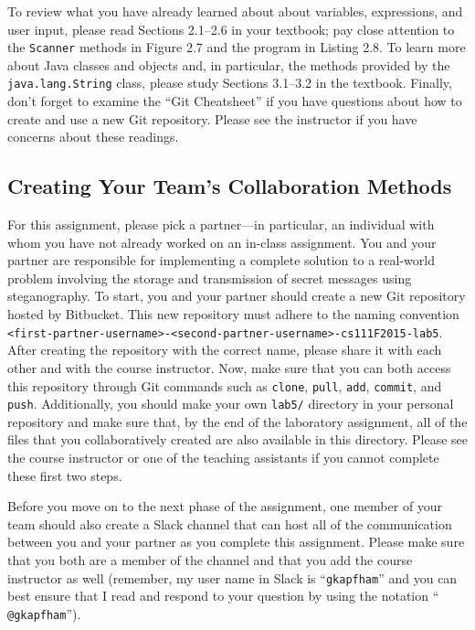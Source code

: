 To review what you have already learned about about variables, expressions, and user input, please read Sections
2.1--2.6 in your textbook; pay close attention to the {\tt Scanner} methods in Figure 2.7 and the program in Listing
2.8. To learn more about Java classes and objects and, in particular, the methods provided by the {\tt java.lang.String}
class, please study Sections 3.1--3.2 in the textbook. Finally, don't forget to examine the ``Git Cheatsheet'' if you
have questions about how to create and use a new Git repository. Please see the instructor if you have concerns about
these readings.

\vspace{-0.05in}
\subsection*{Creating Your Team's Collaboration Methods}
\vspace{-0.05in}

For this assignment, please pick a partner---in particular, an individual with whom you have not already worked on an
in-class assignment. You and your partner are responsible for implementing a complete solution to a real-world problem
involving the storage and transmission of secret messages using steganography. To start, you and your partner should
create a new Git repository hosted by Bitbucket. This new repository must adhere to the naming convention {\tt
<first-partner-username>-<second-partner-username>-cs111F2015-lab5}. After creating the repository with the correct
name, please share it with each other and with the course instructor. Now, make sure that you can both access this
repository through Git commands such as {\tt clone}, {\tt pull}, {\tt add}, {\tt commit}, and {\tt push}. Additionally,
you should make your own {\tt lab5/} directory in your personal repository and make sure that, by the end of the
laboratory assignment, all of the files that you collaboratively created are also available in this directory. Please
see the course instructor or one of the teaching assistants if you cannot complete these first two steps.

Before you move on to the next phase of the assignment, one member of your team should also create a Slack channel that
can host all of the communication between you and your partner as you complete this assignment. Please make sure that
you both are a member of the channel and that you add the course instructor as well (remember, my user name in Slack is
``{\tt gkapfham}'' and you can best ensure that I read and respond to your question by using the notation ``{\tt
@gkapfham}'').

